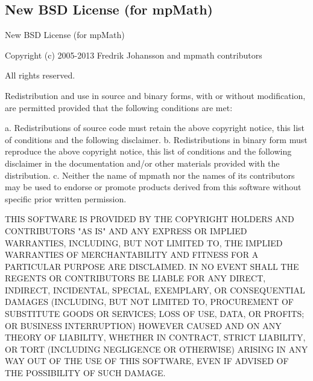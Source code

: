 %
%
%
%
%


\newpage
\subsection{New BSD License (for mpMath)}
\label{New BSD License}
\begin{center}
	New BSD License (for mpMath)
\end{center}

Copyright (c) 2005-2013 Fredrik Johansson and mpmath contributors

All rights reserved.

Redistribution and use in source and binary forms, with or without
modification, are permitted provided that the following conditions are met:

a. Redistributions of source code must retain the above copyright notice,
this list of conditions and the following disclaimer.
b. Redistributions in binary form must reproduce the above copyright
notice, this list of conditions and the following disclaimer in the
documentation and/or other materials provided with the distribution.
c. Neither the name of mpmath nor the names of its contributors
may be used to endorse or promote products derived from this software
without specific prior written permission.


THIS SOFTWARE IS PROVIDED BY THE COPYRIGHT HOLDERS AND CONTRIBUTORS "AS IS"
AND ANY EXPRESS OR IMPLIED WARRANTIES, INCLUDING, BUT NOT LIMITED TO, THE
IMPLIED WARRANTIES OF MERCHANTABILITY AND FITNESS FOR A PARTICULAR PURPOSE
ARE DISCLAIMED. IN NO EVENT SHALL THE REGENTS OR CONTRIBUTORS BE LIABLE FOR
ANY DIRECT, INDIRECT, INCIDENTAL, SPECIAL, EXEMPLARY, OR CONSEQUENTIAL
DAMAGES (INCLUDING, BUT NOT LIMITED TO, PROCUREMENT OF SUBSTITUTE GOODS OR
SERVICES; LOSS OF USE, DATA, OR PROFITS; OR BUSINESS INTERRUPTION) HOWEVER
CAUSED AND ON ANY THEORY OF LIABILITY, WHETHER IN CONTRACT, STRICT
LIABILITY, OR TORT (INCLUDING NEGLIGENCE OR OTHERWISE) ARISING IN ANY WAY
OUT OF THE USE OF THIS SOFTWARE, EVEN IF ADVISED OF THE POSSIBILITY OF SUCH
DAMAGE.





